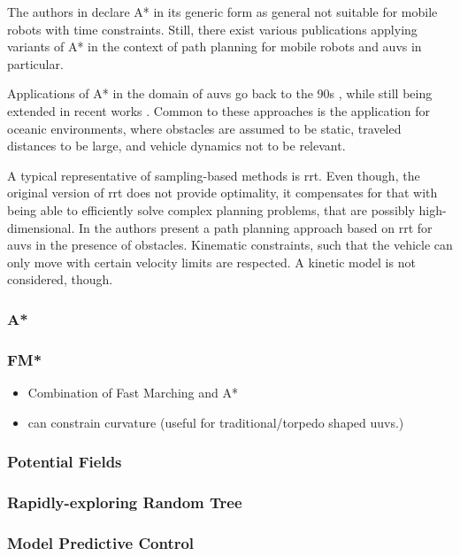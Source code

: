 The authors in \cite{Fernandes2015TowardsAO} declare A* in its generic form as general not suitable for mobile robots with time constraints. Still, there exist various publications applying variants of A* in the context of path planning for mobile robots and \acp{auv} in particular.

Applications of A* in the domain of \acp{auv} go back to the 90s \cite{Carroll92}, while still being extended in recent works \cite{zhang20}. Common to these approaches is the application for oceanic environments, where obstacles are assumed to be static, traveled distances to be large, and vehicle dynamics not to be relevant.

A typical representative of sampling-based methods is \ac{rrt}. Even though, the original version of \ac{rrt} does not provide optimality, it compensates for that with being able to efficiently solve complex planning problems, that are possibly high-dimensional.\cite{Devaurs16}
In \cite{Young13} the authors present a path planning approach based on \ac{rrt} for \acp{auv} in the presence of obstacles. Kinematic constraints, such that the vehicle can only move with certain velocity limits are respected. A kinetic model is not considered, though.



\subsubsection{A*}
\subsubsection{FM*}
\cite{Petres09}
\begin{itemize}
    \color{red}
    \item Combination of Fast Marching and A*
    \item can constrain curvature (useful for traditional/torpedo shaped uuvs.)
\end{itemize}
\subsubsection{Potential Fields}
\subsubsection{Rapidly-exploring Random Tree}
\subsubsection{Model Predictive Control}
